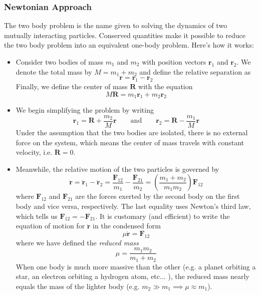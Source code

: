 \documentclass[11pt, a4paper]{article}
\newcommand{\eqtext}[1]{\qquad \text{#1} \qquad}
\newcommand{\bddot}[1]{\ddot{\bm{#1}}}
\begin{document}
\subsubsection{Newtonian Approach}
The two body problem is the name given to solving the dynamics of two mutually interacting particles. Conserved quantities make it possible to reduce the two body problem into an equivalent one-body problem. Here's how it works:
\begin{itemize}
	\item Consider two bodies of mass $ m_{1} $ and $ m_{2} $ with position vectors $ \bm{r}_{1} $ and $ \bm{r}_{2} $. We denote the total mass by $ M = m_{1} + m_{2} $ and define the relative separation as
	\begin{equation*}
		\bm{r} = \bm{r}_{1} - \bm{r}_{2}
	\end{equation*}
	Finally, we define the center of mass $ \bm{R} $ with the equation
	\begin{equation*}
		M\bm{R} = m_{1}\bm{r}_{1} + m_{2} \bm{r}_{2}
	\end{equation*}
	
	\item We begin simplifying the problem by writing
	\begin{equation*}
		\bm{r}_{1} = \bm{R} + \frac{m_{2}}{M}\bm{r} \eqtext{and} \bm{r}_{2} = \bm{R} - \frac{m_{1}}{M}\bm{r}
	\end{equation*}
	Under the assumption that the two bodies are isolated, there is no external force on the system, which means the center of mass travels with constant velocity, i.e. $ \bddot{R} = 0 $.
	
	\item Meanwhile, the relative motion of the two particles is governed by
	\begin{equation*}
		\bddot{r} = \bddot{r}_{1} - \bddot{r}_{2} = \frac{\bm{F}_{12}}{m_{1}} -  \frac{\bm{F}_{21}}{m_{2}} = \left(\frac{m_{1} + m_{2}}{m_{1}m_{2}}\right) \bm{F}_{12}
	\end{equation*}
	where $ \bm{F}_{12} $ and $ \bm{F}_{21} $ are the forces exerted by the second body on the first body and vice versa, respectively. The last equality uses Newton's third law, which tells us $ \bm{F}_{12} = - \bm{F}_{21} $. It is customary (and efficient) to write the equation of motion for $ \bddot{r} $ in the condensed form
	\begin{equation*}
		\mu \bddot{r} = \bm{F}_{12}
	\end{equation*}
	where we have defined the \textit{reduced mass}
	\begin{equation*}
		\mu = \frac{m_{1}m_{2}}{m_{1} + m_{2}}
	\end{equation*}
	When one body is much more massive than the other (e.g. a planet orbiting a star, an electron orbiting a hydrogen atom, etc... ), the reduced mass nearly equals the mass of the lighter body (e.g. $ m_{2} \gg m_{1} \implies \mu \approx m_{1} $).
	

\end{itemize}
\end{document}
